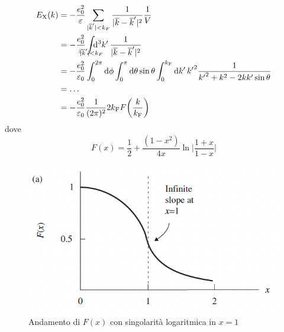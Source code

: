 \begin{equation*}
    \begin{aligned}
        E_{\text X}(k) & =-\frac{e_0^2}{\varepsilon}\sum_{|\overline k'|<k_F}\frac{1}{|\overline k - \overline k'|^2}\frac{1}{V} \\
        & = -\frac{e_0^2}{\varepsilon}\int_{\mathclap{|\overline k'|<k_F}}\dd[3]{k'}\frac{1}{|\overline k - \overline k'|^2} \\
        & = - \frac{e_0^2}{\varepsilon_0}\int_0^{2\pi}\dd{\phi}\int_0^\pi\dd{\theta}\sin\theta\int_0^{k_{\text F}}\dd{k'}{k'}^2\frac{1}{{k'}^2+k^2-2kk'\sin\theta}\\
        & = \dots\\
        & = -\frac{e_0^2}{\varepsilon_0}\frac{1}{(2\pi)^2}2{k}_{\text{F}}F\bigg(\frac{k}{k_{\text F}}\bigg)\\
    \end{aligned}
\end{equation*}
dove
\begin{equation*}
    F(x)=\frac 12 + \frac{(1-x^2)}{4x}\ln\Bigg|\frac{1+x}{1-x}\Bigg|    
\end{equation*}
\begin{figure}[!ht]
    \centering
    \includegraphics[scale=0.6]{images/F(x)jellium.png}
    \caption{Andamento di $F(x)$ con singolarità logaritmica in $x=1$}
    \label{fig:fxjellium}
\end{figure}
\newpage
